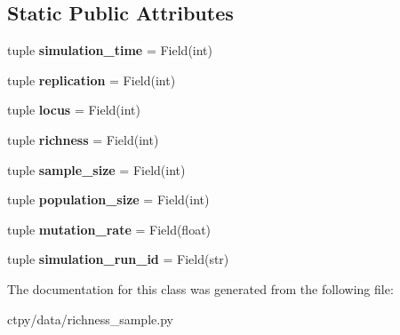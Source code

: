 \subsection*{Static Public Attributes}
\begin{DoxyCompactItemize}
\item 
\hypertarget{classctpy_1_1data_1_1richness__sample_1_1_richness_sample_a68eb673c08d6805ec7cbf3a3e7068b46}{tuple {\bfseries simulation\-\_\-time} = Field(int)}\label{classctpy_1_1data_1_1richness__sample_1_1_richness_sample_a68eb673c08d6805ec7cbf3a3e7068b46}

\item 
\hypertarget{classctpy_1_1data_1_1richness__sample_1_1_richness_sample_a1e9a60f41a65d8dfa0d4a339705e9747}{tuple {\bfseries replication} = Field(int)}\label{classctpy_1_1data_1_1richness__sample_1_1_richness_sample_a1e9a60f41a65d8dfa0d4a339705e9747}

\item 
\hypertarget{classctpy_1_1data_1_1richness__sample_1_1_richness_sample_a6612fa63c3dea6f498a046b50bf90c5f}{tuple {\bfseries locus} = Field(int)}\label{classctpy_1_1data_1_1richness__sample_1_1_richness_sample_a6612fa63c3dea6f498a046b50bf90c5f}

\item 
\hypertarget{classctpy_1_1data_1_1richness__sample_1_1_richness_sample_a12d73e9a2988f502470749a553d3c391}{tuple {\bfseries richness} = Field(int)}\label{classctpy_1_1data_1_1richness__sample_1_1_richness_sample_a12d73e9a2988f502470749a553d3c391}

\item 
\hypertarget{classctpy_1_1data_1_1richness__sample_1_1_richness_sample_a237b768196934d75e3ce25ccc46855f1}{tuple {\bfseries sample\-\_\-size} = Field(int)}\label{classctpy_1_1data_1_1richness__sample_1_1_richness_sample_a237b768196934d75e3ce25ccc46855f1}

\item 
\hypertarget{classctpy_1_1data_1_1richness__sample_1_1_richness_sample_aa520a15eb11320d2c6e9745d09a93eb3}{tuple {\bfseries population\-\_\-size} = Field(int)}\label{classctpy_1_1data_1_1richness__sample_1_1_richness_sample_aa520a15eb11320d2c6e9745d09a93eb3}

\item 
\hypertarget{classctpy_1_1data_1_1richness__sample_1_1_richness_sample_a61f176e0fc3d53500c1797e45690bee6}{tuple {\bfseries mutation\-\_\-rate} = Field(float)}\label{classctpy_1_1data_1_1richness__sample_1_1_richness_sample_a61f176e0fc3d53500c1797e45690bee6}

\item 
\hypertarget{classctpy_1_1data_1_1richness__sample_1_1_richness_sample_a1867be6ea892d9b5d7b33a7135707556}{tuple {\bfseries simulation\-\_\-run\-\_\-id} = Field(str)}\label{classctpy_1_1data_1_1richness__sample_1_1_richness_sample_a1867be6ea892d9b5d7b33a7135707556}

\end{DoxyCompactItemize}


The documentation for this class was generated from the following file\-:\begin{DoxyCompactItemize}
\item 
ctpy/data/richness\-\_\-sample.\-py\end{DoxyCompactItemize}
